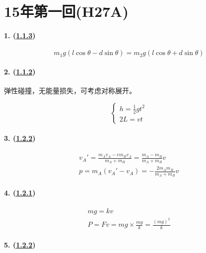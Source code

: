 
\section{15年第一回(H27A)}

\paragraph{1. (\hyperref[subsec:1.1.3]{1.1.3})}

\begin{equation*}
    m_1g(l\cos\theta-d\sin\theta)=m_2g(l\cos\theta+d\sin\theta)
\end{equation*}

\paragraph{2. (\hyperref[subsec:1.1.2]{1.1.2})} 弹性碰撞，无能量损失，可考虑对称展开。

\begin{equation*}
    \begin{cases}
        h=\frac12gt^2\\
        2L=vt
    \end{cases}
\end{equation*}

\paragraph{3. (\hyperref[subsec:1.2.2]{1.2.2})}

\begin{gather*}
    v_A'=\frac{m_Av_A-em_Bv_A}{m_A+m_B}=\frac{m_A-m_B}{m_A+m_B}v\\
    p=m_A(v_A'-v_A)=-\frac{2m_Am_B}{m_A+m_B}v
\end{gather*}

\paragraph{4. (\hyperref[subsec:1.2.1]{1.2.1})}

\begin{gather*}
    mg=kv\\
    P=Fv=mg\times\frac{mg}{k}=\frac{(mg)^2}{k}
\end{gather*}

\paragraph{5. (\hyperref[subsec:1.2.2]{1.2.2})}

